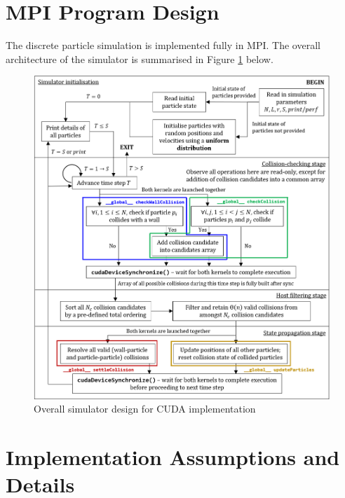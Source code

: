 \documentclass[12pt]{article}
\begin{document}
\maketitle
\setcounter{tocdepth}{1}
\tableofcontents

\pagebreak
\large{}
\section{MPI Program Design}

The discrete particle simulation is implemented fully in MPI. The overall architecture of the simulator is summarised in Figure \ref{fig:simulator-design} below. \\

\begin{figure}[H]
    \includegraphics{chap1Flowchart-CUDA}
    \centering
    \caption{Overall simulator design for CUDA implementation}
    \label{fig:simulator-design}
\end{figure}

\pagebreak

\section{Implementation Assumptions and Details}
\end{document}

